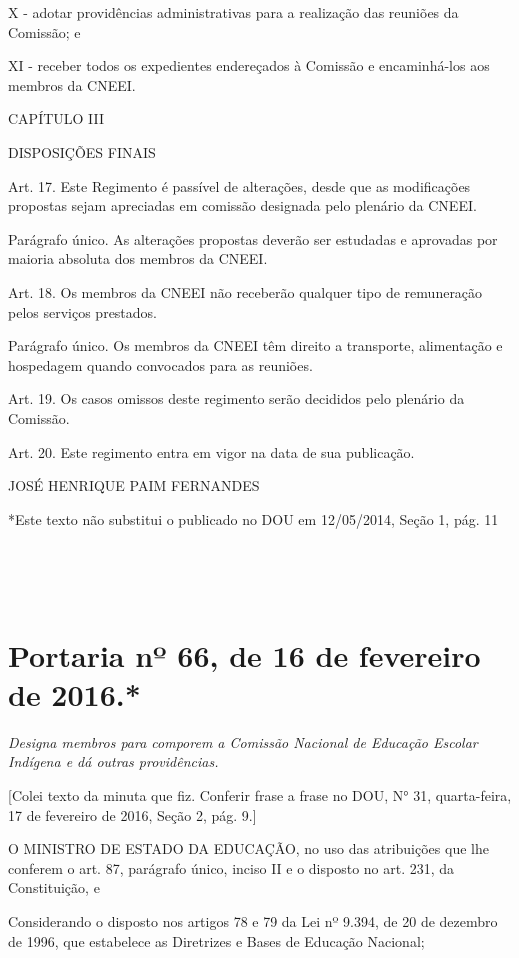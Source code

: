 \documentclass[
]{book}
\begin{document}
X - adotar providências administrativas para a realização das reuniões da Comissão; e

XI - receber todos os expedientes endereçados à Comissão e encaminhá-los aos membros da CNEEI.

CAPÍTULO III

DISPOSIÇÕES FINAIS

Art. 17. Este Regimento é passível de alterações, desde que as modificações propostas sejam apreciadas em comissão designada pelo plenário da CNEEI.

Parágrafo único. As alterações propostas deverão ser estudadas e aprovadas por maioria absoluta dos membros da CNEEI.

Art. 18. Os membros da CNEEI não receberão qualquer tipo de remuneração pelos serviços prestados.

Parágrafo único. Os membros da CNEEI têm direito a transporte, alimentação e hospedagem quando convocados para as reuniões.

Art. 19. Os casos omissos deste regimento serão decididos pelo plenário da Comissão.

Art. 20. Este regimento entra em vigor na data de sua publicação.

JOSÉ HENRIQUE PAIM FERNANDES

*Este texto não substitui o publicado no DOU em 12/05/2014, Seção 1, pág. 11

~

~

\hypertarget{portaria-nuxba-66-de-16-de-fevereiro-de-2016.}{%
\section{Portaria nº 66, de 16 de fevereiro de 2016.*}\label{portaria-nuxba-66-de-16-de-fevereiro-de-2016.}}

\emph{Designa membros para comporem a Comissão Nacional de Educação Escolar Indígena e dá outras providências.}

{[}Colei texto da minuta que fiz. Conferir frase a frase no DOU, N° 31, quarta-feira, 17 de fevereiro de 2016, Seção 2, pág. 9.{]}

O MINISTRO DE ESTADO DA EDUCAÇÃO, no uso das atribuições que lhe conferem o art. 87, parágrafo único, inciso II e o disposto no art. 231, da Constituição, e

Considerando o disposto nos artigos 78 e 79 da Lei nº 9.394, de 20 de dezembro de 1996, que estabelece as Diretrizes e Bases de Educação Nacional;
\end{document}
